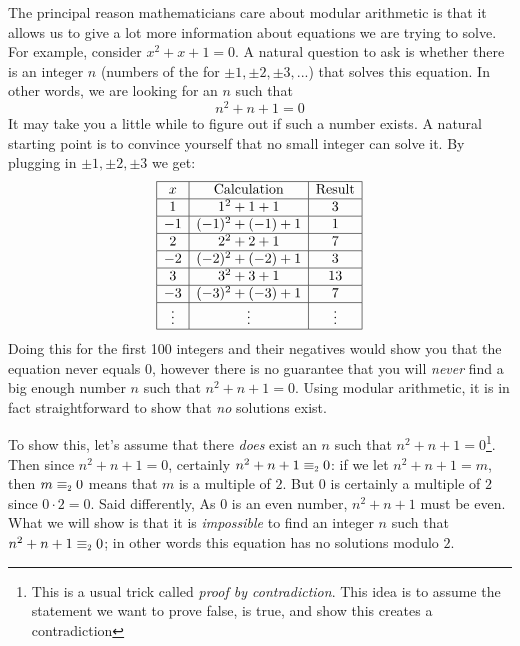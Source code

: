 \documentclass{article}
\newcommand\scalemath[2]{\scalebox{#1}{\mbox{\ensuremath{\displaystyle #2}}}}
\newcommand{\Equiv}[1]{\equiv_{\scalemath{0.6}{#1}}}
\begin{document}
The principal reason mathematicians care about modular arithmetic is that it allows us to give a lot more
information about equations we are trying to solve. For example, consider $x^2+x+1=0$. A natural question to ask
is whether there is an integer $n$ (numbers of the for
$\pm1, \pm2, \pm3, ...$) that solves this equation. In other words, we are looking for an $n$ such that
\[
  n^2+n+1 =0
  \]
It may take you a little while to figure out if such a number exists. A natural starting
point is to convince yourself that no small integer can solve it. By plugging in
$\pm1, \pm2, \pm3$ we get:
\[
\begin{array}{|c|c|c|}
\hline
x & \text{Calculation} & \text{Result} \\
\hline
1 & 1^2 + 1 + 1 & 3 \\
\hline
-1 & (-1)^2 + (-1) + 1 & 1 \\
\hline
2 & 2^2 + 2 + 1 & 7 \\
\hline
-2 & (-2)^2 + (-2) + 1 & 3 \\
\hline
3 & 3^2 + 3 + 1 & 13 \\
\hline
-3 & (-3)^2 + (-3) + 1 & 7 \\
\hline
\vdots & \vdots & \vdots\\
\hline
\end{array}
\]
Doing this for the first 100 integers and their negatives would show you that the equation never equals $0$,
however there is no guarantee that you will \emph{never} find a big enough number $n$ such that $n^2+n+1=0$.
Using modular arithmetic, it is in fact straightforward to show that \emph{no} solutions exist.

To show this, let's assume that there \emph{does} exist an $n$ such that $n^2+n+1=0$\footnote{This is a usual
trick called \emph{proof by contradiction}. This idea is to assume the statement we want to prove false, is
true, and show this creates a contradiction}. Then since $n^2+n+1=0$, certainly $n^2+n+1\Equiv{2}0$: if we let
$n^2+n+1=m$, then $m\Equiv{2} 0$ means that $m$ is a multiple of $2$. But $0$ is certainly a multiple of $2$
since $0\cdot 2=  0$. Said differently, As $0$ is an even number, $n^2+n+1$ must be even. What we will show is that it is \emph{impossible} to find an integer $n$ such that
$n^2+n+1\Equiv{2}0$; in other words this equation has no solutions modulo $2$.
\end{document}
